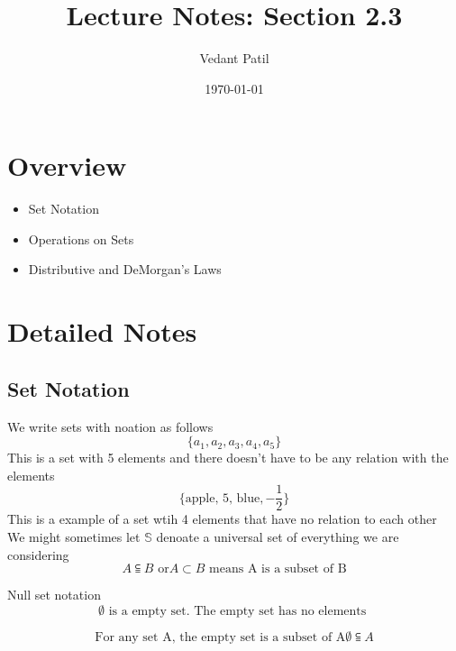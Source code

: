 \documentclass[12pt,a4paper]{article}
\title{Lecture Notes: Section 2.3}
\author{Vedant Patil}
\date{\today}
\begin{document}
\maketitle

\section{Overview}
\begin{tcolorbox}[colback=yellow!10!white,colframe=yellow!50!black,title=Key Points]
  \begin{itemize}
    \item Set Notation 
    \item Operations on Sets
    \item Distributive and DeMorgan's Laws
  \end{itemize}
\end{tcolorbox}

\section{Detailed Notes}
\subsection{Set Notation}
We write sets with noation as follows \\ 
\begin{equation}
  \{a_{1},a_{2},a_{3},a_{4},a_{5}\}
\end{equation}
This is a set with 5 elements and there doesn't have to be any relation with the elements 
\begin{equation}
  \{ \text{apple, 5, blue}, -\frac{1}{2}\}
\end{equation}
This is a example of a set wtih 4 elements that have no relation to each other 
\\ 
We might sometimes let \( \mathbb{S} \) denoate a universal set of everything we are considering 
\begin{equation}
  A \subseteqq B \text{ or} A \subset B \text{ means A is a subset of B} 
\end{equation}

Null set notation 
\begin{equation}
  \emptyset \text{ is a empty set. The empty set has no elements }
\end{equation}

\begin{equation}
  \text{For any set A, the empty set is a subset of A} \emptyset \subseteqq A 
\end{equation}
\end{document}
